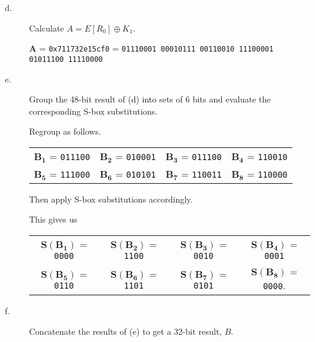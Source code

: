 \documentclass[../hw_sols.tex]{subfiles}
\begin{document}
\begin{description}
\newpage


\item[d.] Calculate $A = E[R_0] \oplus K_1$.

\begin{solution}
	$\mathbf{A}$ 
	= \verb|0x711732e15cf0| 
	= \verb|01110001 00010111 00110010 11100001 01011100 11110000|
\end{solution}

\item[e.] Group the 48-bit result of (d) into sets of 6 bits and evaluate 
the corresponding S-box substitutions.

\begin{solution}

Regroup as follows.
\begin{center}
\begin{tabular}{ c c c c }
	$\mathbf{B_1}$ = \verb|011100| & $\mathbf{B_2}$ = \verb|010001| &
	$\mathbf{B_3}$ = \verb|011100| & $\mathbf{B_4}$ = \verb|110010| \\
	$\mathbf{B_5}$ = \verb|111000| & $\mathbf{B_6}$ = \verb|010101| &
	$\mathbf{B_7}$ = \verb|110011| & $\mathbf{B_8}$ = \verb|110000|
\end{tabular}
\end{center}

Then apply S-box substitutions accordingly.



This gives us
\begin{center}
\begin{tabular}{ c c c c }
	$\mathbf{S(B_1)}$ = \verb|0000| & $\mathbf{S(B_2)}$ = \verb|1100| &  
	$\mathbf{S(B_3)}$ = \verb|0010| & $\mathbf{S(B_4)}$ = \verb|0001| \\
	$\mathbf{S(B_5)}$ = \verb|0110| & $\mathbf{S(B_6)}$ = \verb|1101| &
	$\mathbf{S(B_7)}$ = \verb|0101| & $\mathbf{S(B_8)}$ = \verb|0000|.
\end{tabular}
\end{center}

\end{solution}

\item[f.] Concatenate the results of (e) to get a 32-bit result, $B$.

\begin{solution}


\end{solution}
\end{description}
\end{document}

